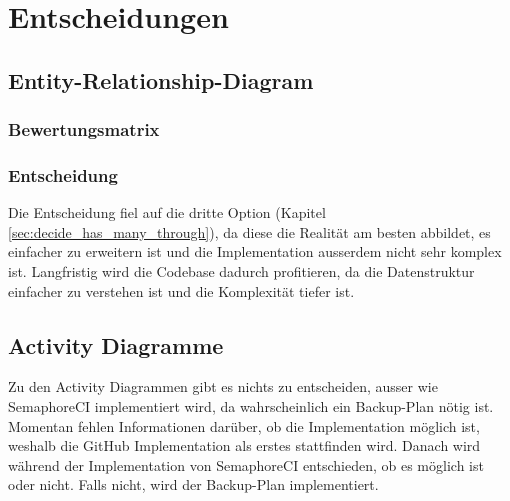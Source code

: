 \section{Entscheidungen}
\begin{minipage}{\textwidth}
    \subsection{Entity-Relationship-Diagram}
    \subsubsection{Bewertungsmatrix}
    \begin{center}
    \end{center}
    \subsubsection{Entscheidung}
    Die Entscheidung fiel auf die dritte Option (Kapitel \ref{sec:decide_has_many_through}), da diese die Realität am besten
    abbildet, es einfacher zu erweitern ist und die Implementation ausserdem nicht sehr komplex ist. \newline
    Langfristig wird die Codebase dadurch profitieren, da die Datenstruktur einfacher zu verstehen ist und die Komplexität
    tiefer ist. \newline
\end{minipage}

\begin{minipage}{\textwidth}
    \subsection{Activity Diagramme}
    Zu den Activity Diagrammen gibt es nichts zu entscheiden, ausser wie SemaphoreCI implementiert wird,
    da wahrscheinlich ein Backup-Plan nötig ist. \newline
    Momentan fehlen Informationen darüber, ob die Implementation möglich ist, weshalb die GitHub Implementation als erstes
    stattfinden wird. Danach wird während der Implementation von SemaphoreCI entschieden, ob es möglich ist oder nicht. Falls
    nicht, wird der Backup-Plan implementiert. \newline
\end{minipage}

